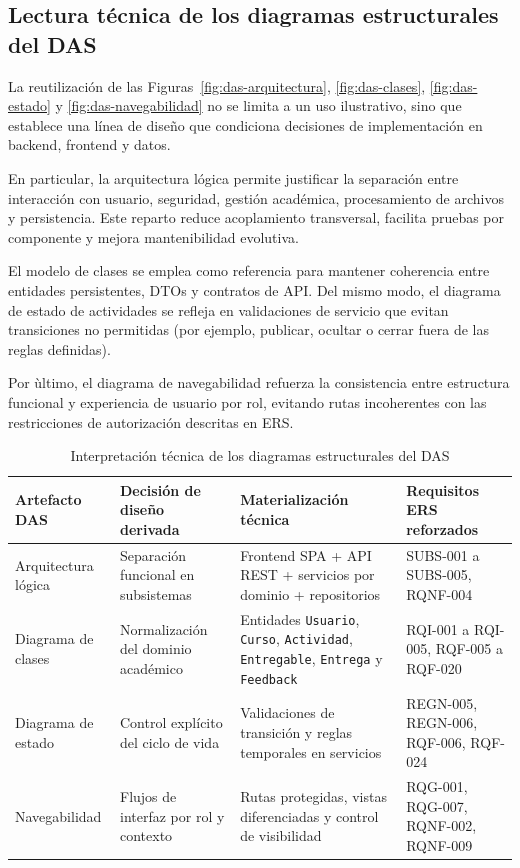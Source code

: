 \subsection{Lectura t\'ecnica de los diagramas estructurales del DAS}

La reutilizaci\'on de las Figuras~\ref{fig:das-arquitectura},
\ref{fig:das-clases}, \ref{fig:das-estado} y \ref{fig:das-navegabilidad}
no se limita a un uso ilustrativo, sino que establece una l\'inea de dise\~no
que condiciona decisiones de implementaci\'on en backend, frontend y datos.

En particular, la arquitectura l\'ogica permite justificar la separaci\'on entre
interacci\'on con usuario, seguridad, gesti\'on acad\'emica, procesamiento de
archivos y persistencia. Este reparto reduce acoplamiento transversal,
facilita pruebas por componente y mejora mantenibilidad evolutiva.

El modelo de clases se emplea como referencia para mantener coherencia entre
entidades persistentes, DTOs y contratos de API. Del mismo modo, el diagrama
de estado de actividades se refleja en validaciones de servicio que evitan
transiciones no permitidas (por ejemplo, publicar, ocultar o cerrar fuera de
las reglas definidas).

Por \`ultimo, el diagrama de navegabilidad refuerza la consistencia entre
estructura funcional y experiencia de usuario por rol, evitando rutas
incoherentes con las restricciones de autorizaci\'on descritas en ERS.

\begin{table}[!htbp]
\centering
\small
\begin{tabular}{|P{2.5cm}|P{3.6cm}|P{3.8cm}|P{2.4cm}|}
\hline
\textbf{Artefacto DAS} & \textbf{Decisi\'on de dise\~no derivada} & \textbf{Materializaci\'on t\'ecnica} & \textbf{Requisitos ERS reforzados} \\
\hline
Arquitectura l\'ogica & Separaci\'on funcional en subsistemas & Frontend SPA + API REST + servicios por dominio + repositorios & SUBS-001 a SUBS-005, RQNF-004 \\
\hline
Diagrama de clases & Normalizaci\'on del dominio acad\'emico & Entidades \texttt{Usuario}, \texttt{Curso}, \texttt{Actividad}, \texttt{Entregable}, \texttt{Entrega} y \texttt{Feedback} & RQI-001 a RQI-005, RQF-005 a RQF-020 \\
\hline
Diagrama de estado & Control expl\'icito del ciclo de vida & Validaciones de transici\'on y reglas temporales en servicios & REGN-005, REGN-006, RQF-006, RQF-024 \\
\hline
Navegabilidad & Flujos de interfaz por rol y contexto & Rutas protegidas, vistas diferenciadas y control de visibilidad & RQG-001, RQG-007, RQNF-002, RQNF-009 \\
\hline
\end{tabular}
\normalsize
\caption{Interpretaci\'on t\'ecnica de los diagramas estructurales del DAS}
\label{tab:das-lectura-estructural}
\end{table}

